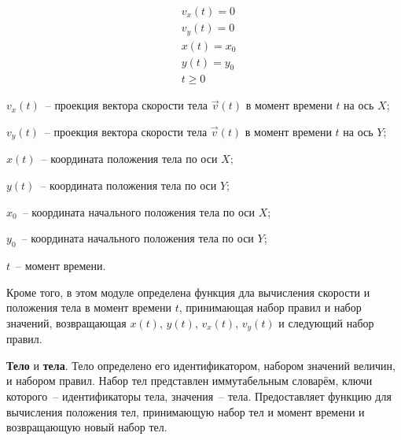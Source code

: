 \begin{align}\label{rules0_0}
     & v_x(t)  = 0 \nonumber   \\
     & v_y(t)  = 0 \nonumber   \\
     & x(t)    = x_0           \\
     & y(t)    = y_0 \nonumber \\
     & t \geqslant 0 \nonumber
\end{align}

\begin{Underequation}
    \(v_x(t)\)~-- проекция вектора скорости тела \(\vec{v}(t)\) в момент времени \(t\) на ось \(X\);

    \(v_y(t)\)~-- проекция вектора скорости тела \(\vec{v}(t)\) в момент времени \(t\) на ось \(Y\);

    \(x(t)\)~-- координата положения тела по оси \(X\);

    \(y(t)\)~-- координата положения тела по оси \(Y\);

    \(x_0\)~-- координата начального положения тела по оси \(X\);

    \(y_0\)~-- координата начального положения тела по оси \(Y\);

    \(t\)~-- момент времени.
\end{Underequation}

Кроме того, в этом модуле определена функция дла вычисления скорости и положения тела в момент времени \(t\),
принимающая набор правил и набор значений, возвращающая \(x(t)\), \(y(t)\), \(v_x(t)\), \(v_y(t)\) и следующий набор правил.

\textbf{Тело} и \textbf{тела}.\label{bodydescr}
Тело определено его идентификатором, набором значений величин, и набором правил. Набор тел
представлен иммутабельным словарём, ключи которого~-- идентификаторы тела, значения~-- тела.
Предоставляет функцию для вычисления положения тел, принимающую набор тел и момент времени
и возвращающую новый набор тел.


